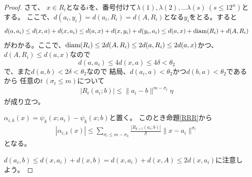 \documentclass[leqno]{jsarticle}
\newcommand{\di}{\text{{\rm diam}}}
\begin{document}
\begin{proof}
さて、
$x\in R_i$となる$i$を、番号付けて$\lambda(1), \lambda(2),\dots \lambda(s)\ (s\le 12^n)$とする。
ここで、$d(a_i,y_i)=d(a_i,R_i)=d(A,R_i)$となる$y_i$をとる。すると
\[
d(a,a_i)\le d(x,a)+d(x,a_i)\le d(a,x)+d(x,y_i)+d(y_i,a_i)\le d(a,x)+\di(R_i)+d(A,R_i)
\]
がわかる。ここで、$\di(R_i)\le 2d(A,R_i)\le 2d(a, R_i)\le 2d(a,x)$かつ、$d(A,R_i)\le d(a,x)$なので
\[
d(a,a_i)\le 4d(x,a)\le 4\delta<\theta_2
\]
で、また$d(a,b)<2\delta<\theta_2$なので
結局、$d(a_i, a)<\theta_2$かつ$d(b,a)<\theta_2$であるから
任意の$t\ (\sigma_t\le m)$について
\begin{align}
|R_t(a_i;b)|\le \|a_i-b\|^{m-\sigma_t}\eta
\end{align}
が成り立つ。


$\alpha_{i,k}(x)=\psi_k(x;a_i)-\psi_k(x;b)$と置く。
このとき命題\ref{RRR}から
\begin{align}
|\alpha_{i;k}(x)|\le \sum_{\sigma_l\le m-\sigma_k}\frac{|R_{k+l}(a_i;b)|}{l!}\|x-a_i\|^{\sigma_l}
\end{align}
となる。

$d(a_i,b)\le d(x, a_i)+d(x,b)=d(x,a_i)+d(x,A)\le 2d(x,a_i)$に注意しよう。



\end{proof}
\end{document}
